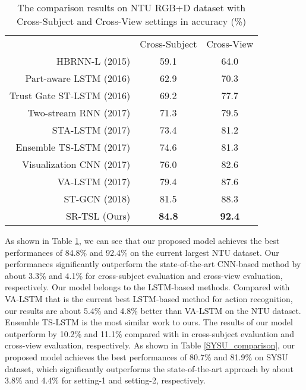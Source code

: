 \documentclass[runningheads]{llncs}
\begin{document}
\setlength{\tabcolsep}{8pt}
\begin{table}[!t]
\fontsize{8pt}{0.85\baselineskip}\selectfont
\begin{center}
\caption{The comparison results on NTU RGB+D dataset with Cross-Subject and Cross-View settings in accuracy (\%) }
\label{NTU_comparison}
\begin{tabular}{r|cc}
\hline\noalign{\smallskip}
\multicolumn{1}{c}{Methods} & Cross-Subject & Cross-View \\
\noalign{\smallskip}
\hline
\hline
\noalign{\smallskip}
HBRNN-L \cite{Du2015Hierarchical} (2015)                 & 59.1 & 64.0 \\
Part-aware LSTM \cite{Shahroudy2016NTU} (2016)          & 62.9 & 70.3 \\
Trust Gate ST-LSTM \cite{Liu2016Spatio-temporal} (2016)  & 69.2 & 77.7 \\
Two-stream RNN \cite{Wang2017Modeling} (2017)            & 71.3 & 79.5 \\
STA-LSTM \cite{Song2017Attention} (2017)                 & 73.4 & 81.2 \\
Ensemble TS-LSTM \cite{Inwoong2017Ensemble} (2017)       & 74.6 & 81.3 \\
Visualization CNN \cite{liu2017enhanced} (2017)         & 76.0 & 82.6 \\
VA-LSTM \cite{Zhang2017View} (2017)                      & 79.4 & 87.6 \\
ST-GCN \cite{Yan2018Spatial} (2018)                      & 81.5 & 88.3 \\
\hline
SR-TSL (Ours)                                              & \textbf{84.8} & \textbf{92.4}\\
\hline
\end{tabular}
\end{center}
\end{table}

As shown in Table \ref{NTU_comparison}, we can see that our proposed model achieves the best performances of 84.8\% and 92.4\% on the current largest NTU dataset. Our performances significantly outperform the state-of-the-art CNN-based method \cite{Yan2018Spatial} by about 3.3\% and 4.1\%  for cross-subject evaluation and cross-view evaluation, respectively. Our model belongs to the LSTM-based methods. Compared with VA-LSTM \cite{Zhang2017View} that is the current best LSTM-based method for action recognition, our results are about 5.4\% and 4.8\% better than VA-LSTM on the NTU dataset. Ensemble TS-LSTM \cite{Inwoong2017Ensemble} is the most similar work to ours. The results of our model outperform by 10.2\% and 11.1\% compared with \cite{Inwoong2017Ensemble} in cross-subject evaluation and cross-view evaluation, respectively. As shown in Table \ref{SYSU_comparison}, our proposed model achieves the best performances of 80.7\% and 81.9\% on SYSU dataset, which significantly outperforms the state-of-the-art approach \cite{Zhang2017View} by about 3.8\% and 4.4\% for setting-1 and setting-2, respectively.
\end{document}
